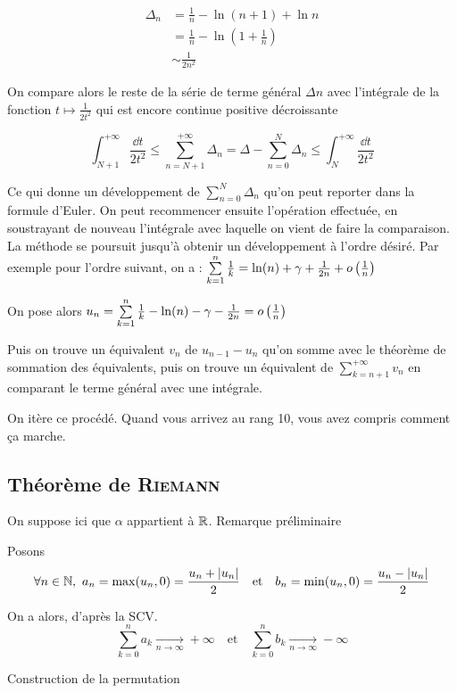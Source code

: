 \[
    \begin{aligned}
        \Delta_n &= \frac{1}{n}-\ln (n+1)+\ln n\\
        &= \frac{1}{n}-\ln \left(1+\frac{1}{n}\right)\\
        &\sim \frac{1}{2n^2}
    \end{aligned}
\]

On compare alors le reste de la série de terme général $\Delta n$ avec l'intégrale de la fonction $t \mapsto \frac1{2t^2}$ qui est encore continue positive décroissante

\[
    \int_{N+1}^{+\infty} \frac{\dd t}{2t^2} \leqslant \sum_{n=N+1}^{+\infty} \Delta_n = \Delta-\sum_{n=0}^{N} \Delta _n \leqslant \int_{N}^{+\infty} \frac{\dd t}{2t^2}
\]

Ce qui donne un développement de $\sum\limits_{n=0}^{N} \Delta _n$ qu'on peut reporter dans la formule d'Euler. On peut recommencer ensuite l'opération effectuée, en soustrayant de nouveau l'intégrale avec laquelle on vient de faire la comparaison. La méthode se poursuit jusqu'à obtenir un développement à l'ordre désiré. Par exemple pour l'ordre suivant, on a : $\sum\limits_{k=1}^n \frac{1}{k} = \ln(n)+\gamma+\frac{1}{2n}+o\left(\frac1{n}\right)$

On pose alors $u_n=\sum\limits_{k=1}^n \frac{1}{k}- \ln(n)-\gamma-\frac{1}{2n}=o\left(\frac{1}{n}\right)$

Puis on trouve un équivalent $v_n$ de $u_{n-1}-u_n$ qu'on somme avec le théorème de sommation des équivalents, puis on trouve un équivalent de $\sum\limits_{k=n+1}^{+\infty} v_n$ en comparant le terme général avec une intégrale.

On itère ce procédé. Quand vous arrivez au rang 10, vous avez compris comment ça marche.

\subsection{Théorème de \textsc{Riemann}}

On suppose ici que $\alpha$ appartient à $\mathbb{R}$.
Remarque préliminaire

Posons
\[
    \forall n \in \NN,\ a_n=\max(u_n,0)=\frac{u_n+|u_n|}2\quad \text{et} \quad b_n=\min(u_n,0)=\frac{u_n-|u_n|}2
\]

On a alors, d'après la SCV.
\[
    \sum_{k=0}^na_k\underset{n\to\infty}{\longrightarrow}+\infty\quad\text{et}\quad\sum_{k=0}^nb_k\underset{n\to\infty}{\longrightarrow}-\infty
\]

Construction de la permutation

